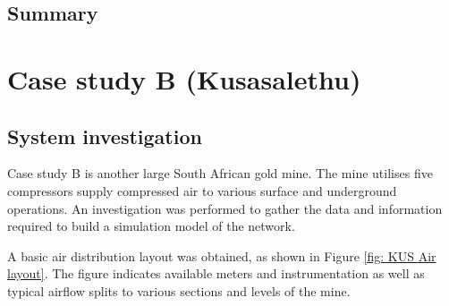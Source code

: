 \subsection{Summary}
\newpage
\section{Case study B \tiny{\color{blue}(Kusasalethu)}}

	\subsection{System investigation}
	Case study B is another large South African gold mine. The mine utilises five compressors supply compressed air to various surface and underground operations. An investigation was performed to gather the data and information required to build a simulation model of the network.
	\par 
	A basic air distribution layout was obtained, as shown in Figure \ref{fig: KUS Air layout}.  The figure indicates available meters and instrumentation as well as typical airflow splits to various sections and levels of the mine.
	\par 

